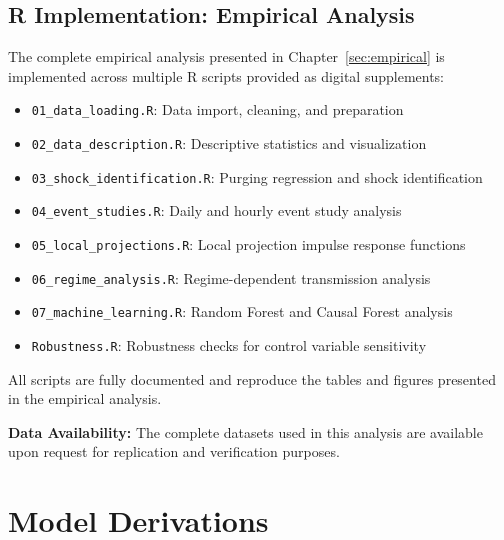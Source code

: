 \documentclass[12pt,a4paper]{article}
\begin{document}
\begin{appendices}
\subsection{R Implementation: Empirical Analysis}
\label{app:r_implementation}

The complete empirical analysis presented in Chapter~\ref{sec:empirical} is implemented across multiple R scripts provided as digital supplements:

\begin{itemize}
	\item \texttt{01\_data\_loading.R}: Data import, cleaning, and preparation
	\item \texttt{02\_data\_description.R}: Descriptive statistics and visualization
	\item \texttt{03\_shock\_identification.R}: Purging regression and shock identification
	\item \texttt{04\_event\_studies.R}: Daily and hourly event study analysis
	\item \texttt{05\_local\_projections.R}: Local projection impulse response functions
	\item \texttt{06\_regime\_analysis.R}: Regime-dependent transmission analysis
	\item \texttt{07\_machine\_learning.R}: Random Forest and Causal Forest analysis
	\item \texttt{Robustness.R}: Robustness checks for control variable sensitivity
\end{itemize}

All scripts are fully documented and reproduce the tables and figures presented in the empirical analysis. 

\textbf{Data Availability:} The complete datasets used in this analysis are available upon request for replication and verification purposes. 


\newpage

\section{Model Derivations}
\label{app:model_derivations}


\end{appendices}
\end{document}
